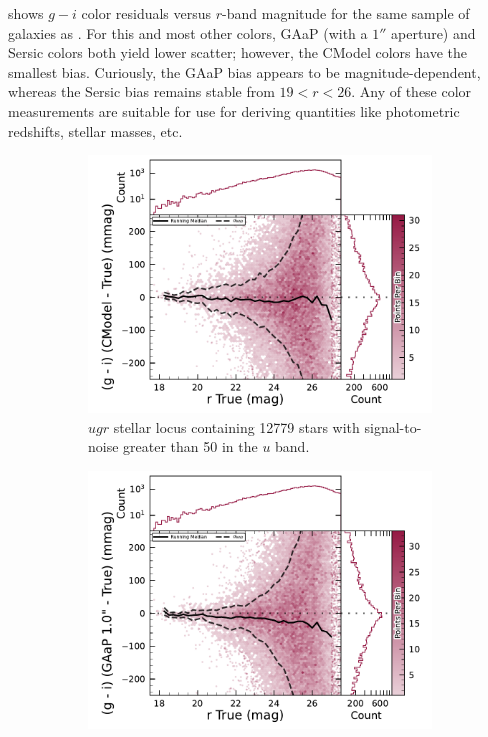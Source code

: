  shows $g-i$ color residuals versus $r$-band magnitude for the same sample of galaxies as .
For this and most other colors, \gls{GAaP} (with a $1''$ aperture) and Sersic colors both yield lower scatter; however, the CModel colors have the smallest bias.
Curiously, the \gls{GAaP} bias appears to be magnitude-dependent, whereas the Sersic bias remains stable from $19<r<26$.
Any of these color measurements are suitable for use for deriving quantities like photometric redshifts, stellar masses, etc.

\begin{figure}[hbt!]
  \centering
  \begin{subfigure}[t]{0.31\textwidth}
\includegraphics[width=\linewidth]{injected_lsst_cells_v1_5063_r_color_cmodel_g_minus_i.pdf}
  \caption{$ugr$ stellar locus containing 12779 stars with signal-to-noise greater than 50 in the $u$ band.}
  \end{subfigure}\hfill
  \begin{subfigure}[t]{0.31\textwidth}
\includegraphics[width=\linewidth]{injected_lsst_cells_v1_5063_r_color_gaap_g_minus_i.pdf}

\end{subfigure}
\end{figure}
